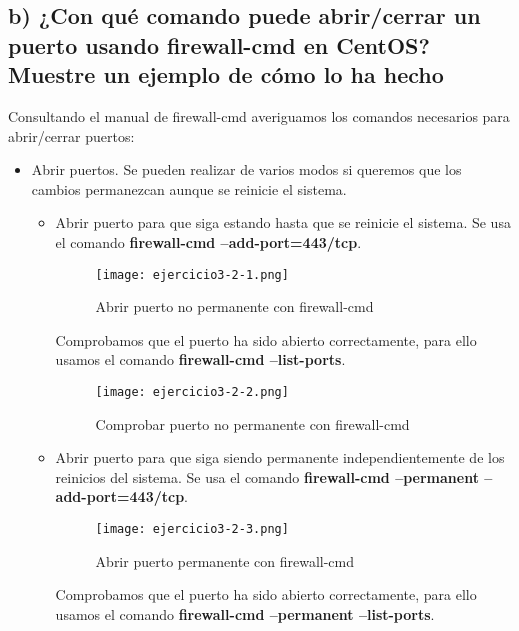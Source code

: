 	\subsection{b) ¿Con qué comando puede abrir/cerrar un puerto usando firewall-cmd en CentOS? Muestre un ejemplo de cómo lo ha hecho}
	
	Consultando el manual de firewall-cmd averiguamos los comandos necesarios para abrir/cerrar puertos\cite{ejercicio3-2,ejercicio3-3}:
	
	\begin{itemize}
		\item Abrir puertos. Se pueden realizar de varios modos si queremos que los cambios permanezcan aunque se reinicie el sistema.
		\begin{itemize}
			\item Abrir puerto para que siga estando hasta que se reinicie el sistema. Se usa el comando \textbf{firewall-cmd --add-port=443/tcp}.
			 
			 \begin{figure}[H] 
			 	\centering
			 	\texttt{[image: ejercicio3-2-1.png]} 
			 	\label{figura23} 
			 	
			 	\caption{Abrir puerto no permanente con firewall-cmd}
			 \end{figure}
			 
			 Comprobamos que el puerto ha sido abierto correctamente, para ello usamos el comando \textbf{firewall-cmd --list-ports}.
			 
			 \begin{figure}[H] 
			 	\centering
			 	\texttt{[image: ejercicio3-2-2.png]} 
			 	\label{figura24} 
			 	
			 	\caption{Comprobar puerto no permanente con firewall-cmd}
			 \end{figure}
			

			
			\item Abrir puerto para que siga siendo permanente independientemente de los reinicios del sistema. Se usa el comando \textbf{firewall-cmd --permanent --add-port=443/tcp}.
			\begin{figure}[H] 
				\centering
				\texttt{[image: ejercicio3-2-3.png]} 
				\label{figura25} 
				
				\caption{Abrir puerto permanente con firewall-cmd}
			\end{figure}
			
			Comprobamos que el puerto ha sido abierto correctamente, para ello usamos el comando \textbf{firewall-cmd --permanent --list-ports}.
			

\end{itemize}
\end{itemize}
